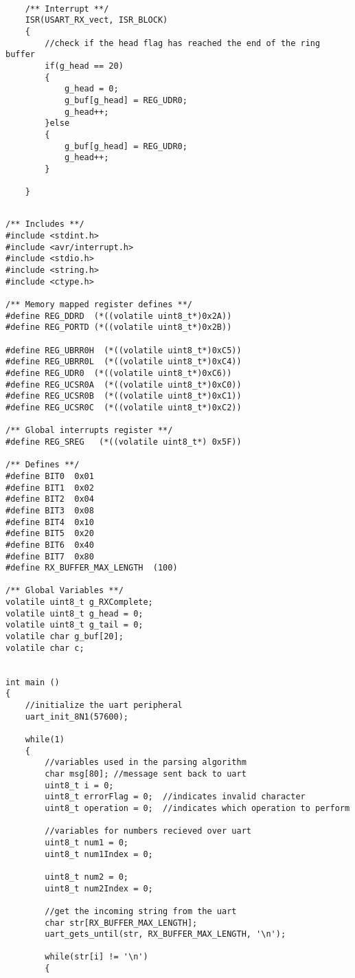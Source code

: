 \documentclass[11pt,pdftex,portrait,letterpaper]{article}
\begin{document}
\begin{lstlisting}[caption={Program 1}, label=l:programx]
	
	/** Interrupt **/
	ISR(USART_RX_vect, ISR_BLOCK)
	{
		//check if the head flag has reached the end of the ring buffer
		if(g_head == 20)
		{
			g_head = 0;
			g_buf[g_head] = REG_UDR0;
			g_head++;
		}else
		{
			g_buf[g_head] = REG_UDR0;
			g_head++;
		}
		
	}
		
	\end{lstlisting}
	
	\begin{lstlisting}[caption={Program 2}, label=l:programx]
/** Includes **/
#include <stdint.h>
#include <avr/interrupt.h>
#include <stdio.h>
#include <string.h>
#include <ctype.h>

/** Memory mapped register defines **/
#define REG_DDRD  (*((volatile uint8_t*)0x2A))
#define REG_PORTD (*((volatile uint8_t*)0x2B))

#define REG_UBRR0H  (*((volatile uint8_t*)0xC5))
#define REG_UBRR0L  (*((volatile uint8_t*)0xC4))
#define REG_UDR0  (*((volatile uint8_t*)0xC6))
#define REG_UCSR0A  (*((volatile uint8_t*)0xC0))
#define REG_UCSR0B  (*((volatile uint8_t*)0xC1))
#define REG_UCSR0C  (*((volatile uint8_t*)0xC2))

/** Global interrupts register **/
#define REG_SREG   (*((volatile uint8_t*) 0x5F))

/** Defines **/
#define BIT0  0x01
#define BIT1  0x02
#define BIT2  0x04
#define BIT3  0x08
#define BIT4  0x10
#define BIT5  0x20
#define BIT6  0x40
#define BIT7  0x80
#define RX_BUFFER_MAX_LENGTH  (100)

/** Global Variables **/
volatile uint8_t g_RXComplete;
volatile uint8_t g_head = 0;
volatile uint8_t g_tail = 0;
volatile char g_buf[20];
volatile char c;


int main ()
{
	//initialize the uart peripheral
	uart_init_8N1(57600);
	
	while(1)
	{
		//variables used in the parsing algorithm
		char msg[80]; //message sent back to uart
		uint8_t i = 0;
		uint8_t errorFlag = 0;  //indicates invalid character
		uint8_t operation = 0;  //indicates which operation to perform
		
		//variables for numbers recieved over uart
		uint8_t num1 = 0;
		uint8_t num1Index = 0;
		
		uint8_t num2 = 0;
		uint8_t num2Index = 0;
		
		//get the incoming string from the uart
		char str[RX_BUFFER_MAX_LENGTH];
		uart_gets_until(str, RX_BUFFER_MAX_LENGTH, '\n'); 
		
		while(str[i] != '\n')
		{
			

\end{lstlisting}
\end{document}
